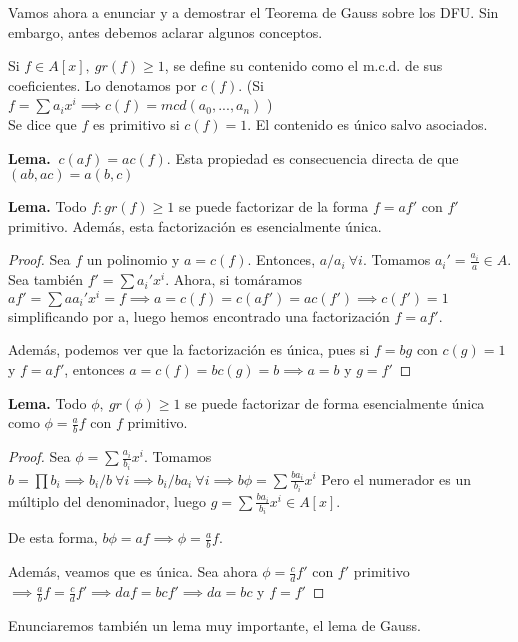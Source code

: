 Vamos ahora a enunciar y a demostrar el Teorema de Gauss sobre los DFU. Sin embargo, antes debemos aclarar algunos conceptos.
\begin{ndef}
Si $f \in A[x],\ gr(f) \geq 1$, se define su contenido como el m.c.d. de sus coeficientes. Lo denotamos por $c(f)$. (Si $f= \sum a_i x^i \implies c(f) = mcd(a_0,...,a_n)$	)\\
Se dice que $f$ es primitivo si $c(f) = 1$. El contenido es único salvo asociados.
\end{ndef}
\textbf{Lema.} $ \ c(af) = ac(f)$. Esta propiedad es consecuencia directa de que $(ab,ac) = a(b,c)$

\textbf{Lema.} Todo $f: gr(f) \geq 1$ se puede factorizar de la forma $f = af'$ con $f'$ primitivo. Además, esta factorización es esencialmente única.
\begin{proof}
	Sea $f$ un polinomio y $a = c(f)$. Entonces, $a/a_i \ \forall i$. Tomamos $a_i' = \frac{a_i}{a} \in A$. Sea también $f' = \sum a_i'x^i$. Ahora, si tomáramos $af'= \sum aa_i' x^i = f \implies a = c(f) = c(af') = ac(f') \implies c(f') = 1$ simplificando por a, luego hemos encontrado una factorización $f=af'$.

	Además, podemos ver que la factorización es única, pues si $f=bg$ con $c(g)=1$ y $f=af'$, entonces $a = c(f) = b c(g) = b \implies a=b$ y $g=f'$
\end{proof}

\textbf{Lema.} Todo $\phi,\ gr(\phi) \geq 1$ se puede factorizar de forma esencialmente única como $\phi = \frac{a}{b} f$ con $f$ primitivo.
\begin{proof}
	Sea $\phi = \sum \frac{a_i}{b_i} x^i$. Tomamos $b= \prod b_i \implies b_i/b \ \forall i \implies b_i /ba_i \ \forall i \implies b \phi = \sum \frac{ba_i}{b_i}x^i$ Pero el numerador es un múltiplo del denominador, luego $g = \sum \frac{ba_i}{b_i}x^i \in A[x]$.

	De esta forma, $b\phi = af \implies \phi = \frac{a}{b} f$.

	Además, veamos que es única. Sea ahora $\phi = \frac{c}{d} f'$ con $f'$ primitivo$\implies \frac{a}{b} f = \frac{c}{d} f' \implies daf=bcf' \implies da = bc$ y $f=f'$
\end{proof}

Enunciaremos también un lema muy importante, el lema de Gauss.\\

